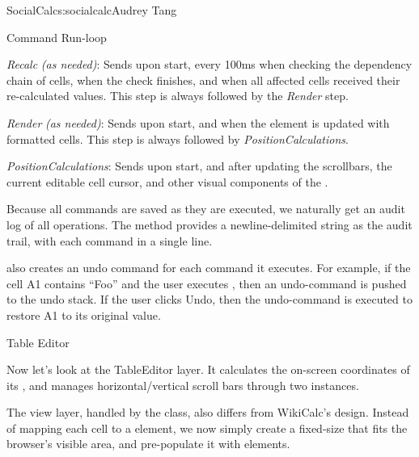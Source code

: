 \begin{aosachapter}{SocialCalc}{s:socialcalc}{Audrey Tang}
\begin{aosasect1}{Command Run-loop}
\begin{aosadescription}
\pagebreak

  \item{\emph{Recalc}} \emph{(as{ }needed)}: Sends  upon start,
   every 100ms when checking the dependency chain of
  cells,  when the check finishes, and
   when all affected cells received their
  re-calculated values.  This step is always followed by the \emph{Render}
  step.

  \item{\emph{Render}} \emph{(as{ }needed)}: Sends  upon
  start, and  when the
   element is updated with
  formatted cells. This step is always followed by \emph{PositionCalculations}.

  \item{\emph{PositionCalculations}}: Sends  upon
  start, and  after updating the scrollbars, the
  current editable cell cursor, and other visual components of the
  .

\end{aosadescription}

Because all commands are saved as they are executed, we naturally get
an audit log of all operations.  The 
method provides a newline-delimited string as the audit trail, with
each command in a single line.

 also creates an undo command for each
command it executes.  For example, if the cell A1 contains ``Foo''
and the user executes , then an undo-command
 is pushed to the undo stack.  If the user
clicks Undo, then the undo-command is executed to restore A1 to its
original value.

\end{aosasect1}

\begin{aosasect1}{Table Editor}

Now let's look at the TableEditor layer.  It calculates the on-screen
coordinates of its , and manages
horizontal/vertical scroll bars through two 
instances.


The view layer, handled by the  class, also
differs from WikiCalc's design.  Instead of mapping each cell to a
 element, we now simply create a
fixed-size  that fits the
browser's visible area, and pre-populate it with
 elements.


\end{aosasect1}
\end{aosachapter}
